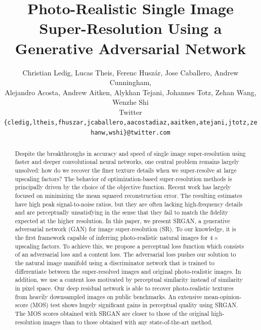 \documentclass[10pt,twocolumn,letterpaper]{article}
\begin{document}
\title{Photo-Realistic Single Image Super-Resolution Using a Generative Adversarial Network}

\onehalfspacing
\author{Christian Ledig, Lucas Theis, Ferenc Husz\'{a}r, Jose Caballero, Andrew Cunningham, \\Alejandro Acosta, Andrew Aitken, Alykhan Tejani, Johannes Totz, Zehan Wang, Wenzhe Shi\\
        Twitter\\
        {\tt\footnotesize \{cledig,ltheis,fhuszar,jcaballero,aacostadiaz,aaitken,atejani,jtotz,zehanw,wshi\}@twitter.com}
        }

\maketitle

\singlespacing
\begin{abstract}
    Despite the breakthroughs in accuracy and speed of single image super-resolution using faster and deeper convolutional neural networks, one central problem remains largely unsolved: how do we recover the finer texture details when we super-resolve at large upscaling factors?
    The behavior of optimization-based super-resolution methods is principally driven by the choice of the objective function. Recent work has largely focused on minimizing the mean squared reconstruction error. The resulting estimates have high peak signal-to-noise ratios, but they are often lacking high-frequency details and are perceptually unsatisfying in the sense that they fail to match the fidelity expected at the higher resolution.
  In this paper, we present SRGAN, a generative adversarial network (GAN) for image super-resolution (SR). To our knowledge, it is the first framework capable of inferring photo-realistic natural images for $4\times$ upscaling factors. To achieve this, we propose a perceptual loss function which consists of an adversarial loss and a content loss. The adversarial loss pushes our solution to the natural image manifold using a discriminator network that is trained to differentiate between the super-resolved images and original photo-realistic images. In addition, we use a content loss motivated by perceptual similarity instead of similarity in pixel space. Our deep residual network is able to recover photo-realistic textures from heavily downsampled images on public benchmarks.
An extensive mean-opinion-score (MOS) test shows hugely significant gains in perceptual quality using SRGAN. The MOS scores obtained with SRGAN are closer to those of the original high-resolution images than to those obtained with any state-of-the-art method.
\end{abstract}
\end{document}
